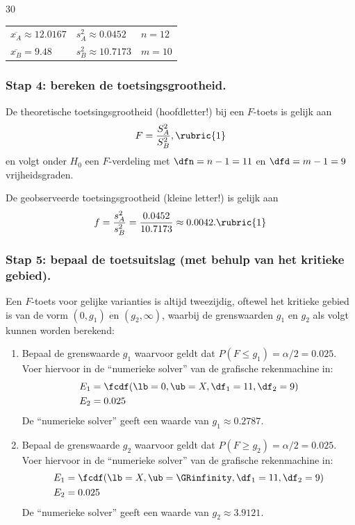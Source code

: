 \begin{question}{30}
{        \begin{center}
            \begin{tabular}{C{.3\textwidth} C{.3\textwidth} C{.3\textwidth}}
                $\overline{x_A} \approx 12.0167$ & $s_A^2 \approx 0.0452$ & $n = 12$ \\
                $\overline{x_B} = 9.48$ & $s_B^2 \approx 10.7173$ & $m = 10$
            \end{tabular}
        \end{center}

        \subsubsection*{Stap 4: bereken de toetsingsgrootheid.}
        De theoretische toetsingsgrootheid (hoofdletter!) bij een $F$-toets is gelijk aan
        \[
            F = \frac{S_A^2}{S_B^2}, \rubric{1}
        \]
        en volgt onder $H_0$ een $F$-verdeling met $\dfn = n-1 = 11$ en $\dfd = m-1 = 9$ vrijheidsgraden. 

        De geobserveerde toetsingsgrootheid (kleine letter!) is gelijk aan
        \[
            f = \frac{s_A^2}{s_B^2} = \frac{0.0452}{10.7173} \approx 0.0042. \rubric{1}
        \]
        
        \subsubsection*{Stap 5: bepaal de toetsuitslag (met behulp van het kritieke gebied).}

        Een $F$-toets voor gelijke varianties is altijd tweezijdig, oftewel het kritieke gebied is van de vorm $(0, g_1)$ en $(g_2, \infty)$, waarbij de grenswaarden $g_1$ en $g_2$ als volgt kunnen worden berekend:
        \begin{enumerate}
            \item Bepaal de grenswaarde $g_1$ waarvoor geldt dat $P(F \leq g_1) = \alpha/2 = 0.025$.
            Voer hiervoor in de \enquote{numerieke solver} van de grafische rekenmachine in:
            \begin{align*}
                E_1 &= \fcdf(\lb=0, \ub=X, \df_1=11, \df_2=9) \\
                E_2 &= 0.025
            \end{align*}
            De \enquote{numerieke solver} geeft een waarde van $g_1 \approx 0.2787$.
            \item Bepaal de grenswaarde $g_2$ waarvoor geldt dat $P(F \geq g_2) = \alpha/2 = 0.025$.
            Voer hiervoor in de \enquote{numerieke solver} van de grafische rekenmachine in:
            \begin{align*}
                E_1 &= \fcdf(\lb=X, \ub=\GRinfinity, \df_1=11, \df_2=9) \\
                E_2 &= 0.025
            \end{align*}
            De \enquote{numerieke solver} geeft een waarde van $g_2 \approx 3.9121$.
        \end{enumerate}
        
}
\end{question}
